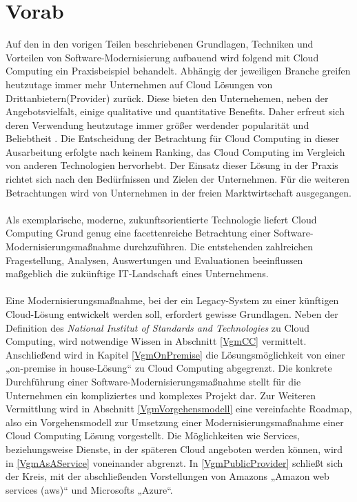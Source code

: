 \section{Vorab}
\label{VgmVorab}

Auf den in den vorigen Teilen beschriebenen Grundlagen, Techniken und Vorteilen von Software-Modernisierung aufbauend wird folgend mit Cloud Computing ein Praxisbeispiel behandelt.
Abhängig der jeweiligen Branche greifen heutzutage immer mehr Unternehmen auf Cloud Lösungen von Drittanbietern(Provider) zurück. Diese bieten den Unternehemen, neben der Angebotsvielfalt, einige qualitative und quantitative Benefits. Daher erfreut sich deren Verwendung heutzutage immer größer werdender popularität und Beliebtheit \cite{skyhigh}. Die Entscheidung der Betrachtung für Cloud Computing in dieser Ausarbeitung erfolgte nach keinem  Ranking, das Cloud Computing im Vergleich von anderen Technologien hervorhebt. Der Einsatz dieser Lösung in der Praxis richtet sich nach den Bedürfnissen und Zielen der Unternehmen. Für die weiteren Betrachtungen wird von Unternehmen in der freien Marktwirtschaft ausgegangen. 
\\\\
Als exemplarische, moderne, zukunftsorientierte Technologie liefert Cloud Computing Grund genug eine facettenreiche  Betrachtung  einer Software-Modernisierungsmaßnahme durchzuführen. Die entstehenden zahlreichen Fragestellung, Analysen, Auswertungen und Evaluationen beeinflussen maßgeblich die zukünftige IT-Landschaft eines Unternehmens. 
\\\\
Eine Modernisierungsmaßnahme, bei der ein Legacy-System zu einer künftigen Cloud-Lösung entwickelt werden soll, erfordert gewisse Grundlagen. Neben der Definition des \textit{National Institut of Standards and Technologies} zu Cloud Computing, wird  notwendige Wissen in Abschnitt \ref{VgmCC}   vermittelt.  Anschließend wird in Kapitel  \ref{VgmOnPremise}  die Lösungsmöglichkeit von einer „on-premise in house-Lösung“ zu Cloud Computing abgegrenzt. Die konkrete Durchführung einer Software-Modernisierungsmaßnahme stellt für die  Unternehmen ein kompliziertes und komplexes Projekt dar. Zur Weiteren Vermittlung wird in Abschnitt \ref{VgmVorgehensmodell}  eine vereinfachte Roadmap, also ein Vorgehensmodell zur Umsetzung einer Modernisierungsmaßnahme einer Cloud Computing Lösung vorgestellt. Die Möglichkeiten wie Services, beziehungsweise Dienste, in der späteren Cloud angeboten werden können, wird in \ref{VgmAsAService}  voneinander abgrenzt. In \ref{VgmPublicProvider}   schließt sich der Kreis, mit der abschließenden Vorstellungen von Amazons „Amazon web services (aws)“ und Microsofts „Azure“.
\newpage